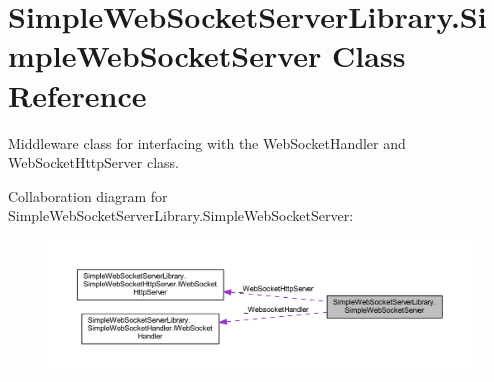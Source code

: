 \hypertarget{class_simple_web_socket_server_library_1_1_simple_web_socket_server}{}\section{Simple\+Web\+Socket\+Server\+Library.\+Simple\+Web\+Socket\+Server Class Reference}
\label{class_simple_web_socket_server_library_1_1_simple_web_socket_server}


Middleware class for interfacing with the Web\+Socket\+Handler and Web\+Socket\+Http\+Server class.  




Collaboration diagram for Simple\+Web\+Socket\+Server\+Library.\+Simple\+Web\+Socket\+Server\+:
\nopagebreak
\begin{figure}[H]
\begin{center}
\leavevmode
\includegraphics[width=350pt]{class_simple_web_socket_server_library_1_1_simple_web_socket_server__coll__graph}
\end{center}
\end{figure}

